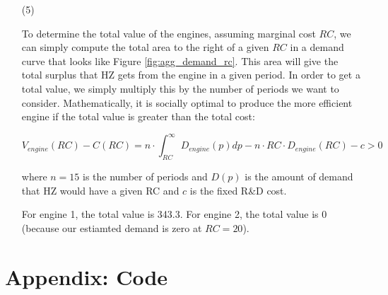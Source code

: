 \documentclass[paper=a4, fontsize=11pt]{scrartcl} %
\numberwithin{equation}{section} %
\numberwithin{figure}{section} %
\numberwithin{table}{section} %
\newcommand{\mylisting}[2][]{%
}
\begin{document}
\begin{itemize}
\begin{itemize}
\item[(5)]

To determine the total value of the engines, assuming marginal cost $RC$, we can simply compute the total area to the right of a given $RC$ in a demand curve that looks like Figure \ref{fig:agg_demand_rc}. This area will give the total surplus that HZ gets from the engine in a given period.  In order to get a total value, we simply multiply this by the number of periods we want to consider. Mathematically, it is socially optimal to produce the more efficient engine if the total value is greater than the total cost:

\begin{equation}
V_{engine}(RC) - C(RC)= n \cdot \int_{RC}^{\infty} D_{engine}(p) dp - n\cdot RC \cdot D_{engine}(RC)- c > 0
\end{equation}

\noindent where $n=15$ is the number of periods and $D(p)$ is the amount of demand that HZ would have a given RC and $c$ is the fixed R\&D cost.

For engine 1, the total value is 343.3. For engine 2, the total value is 0 (because our estiamted demand is zero at $RC=20$).

\end{itemize}

\end{itemize}

\newpage
\section*{Appendix: Code}

\mylisting[language=R]{./rust.R}
\end{document}
